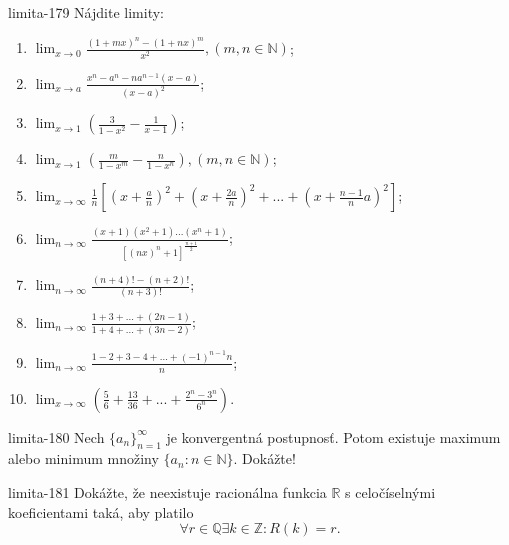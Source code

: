 \begin{defproblem}{limita-179}
Nájdite limity:
\begin{multicols}{2}
\begin{enumerate}
    \item $\lim_{x \rightarrow 0} \frac{(1+mx)^n-(1+nx)^m}{x^2},(m,n \in \mathbb{N})$;
    \item $\lim_{x \rightarrow a} \frac{x^n-a^n-na^{n-1}(x-a)}{(x-a)^2}$;
    \item $\lim_{x \rightarrow 1} (\frac{3}{1-x^2}-\frac{1}{x-1})$;
    \item $\lim_{x \rightarrow 1} (\frac{m}{1-x^m}-\frac{n}{1-x^n}),(m,n \in \mathbb{N})$;
    \item $\lim_{x \rightarrow \infty} \frac{1}{n}[(x+\frac{a}{n})^2+(x+\frac{2a}{n})^2+...+(x+\frac{n-1}{n}a)^2]$;
    \item $\lim_{n\rightarrow \infty} \frac{(x+1)(x^2+1)...(x^n+1)}{[(nx)^n+1]^{\frac{n+1}{2}}}$;
    \item $\lim_{n \rightarrow \infty} \frac{(n+4)!-(n+2)!}{(n+3)!}$;
    \item $\lim_{n \rightarrow \infty} \frac{1+3+...+(2n-1)}{1+4+...+(3n-2)}$;
    \item $\lim_{n \rightarrow \infty} \frac{1-2+3-4+...+(-1)^{n-1}n}{n}$;
    \item $\lim_{x \rightarrow \infty} (\frac{5}{6}+\frac{13}{36}+...+\frac{2^n-3^n}{6^n})$.
\end{enumerate}
\end{multicols}
\end{defproblem}

\begin{defproblem}{limita-180}
Nech ${\{a_n\}}_{n=1}^\infty$ je konvergentná postupnosť. Potom existuje maximum alebo minimum množiny $\{a_n: n \in \mathbb{N}\}$. Dokážte!
\end{defproblem}

\begin{defproblem}{limita-181}
Dokážte, že neexistuje racionálna funkcia $\mathbb{R}$ s celočíselnými koeficientami taká, aby platilo
$$\forall r \in \mathbb{Q} \exists k \in \mathbb{Z}: R(k)=r.$$
\end{defproblem}


